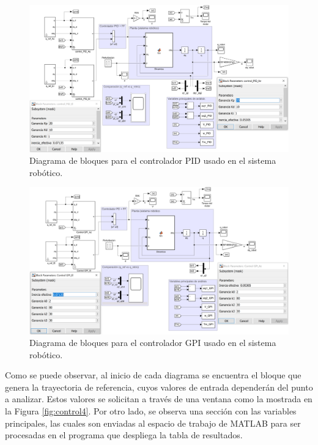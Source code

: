 \begin{figure}[H]
	\centering
	\includegraphics[width=\columnwidth]{imagenes/control2}
	\caption{Diagrama de bloques para el controlador PID usado en el sistema robótico.}
	\label{fig:control2}
\end{figure}

\begin{figure}[H]
	\centering
	\includegraphics[width=\columnwidth]{imagenes/control3}
	\caption{Diagrama de bloques para el controlador GPI usado en el sistema robótico.}
	\label{fig:control3}
\end{figure}

Como se puede observar, al inicio de cada diagrama se encuentra el bloque que genera la trayectoria de referencia, cuyos valores de entrada dependerán del punto a analizar. Estos valores se solicitan a través de una ventana como la mostrada en la Figura \ref{fig:control4}. Por otro lado, se observa una sección con las variables principales, las cuales son enviadas al espacio de trabajo de MATLAB para ser procesadas en el programa que despliega la tabla de resultados.

